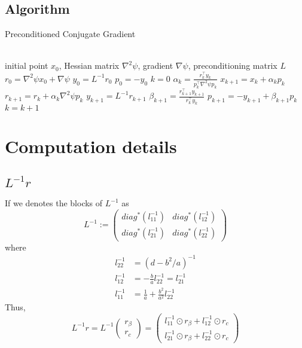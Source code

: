 \documentclass{article}
\begin{document}
\subsection{Algorithm}
\begin{algorithm}[H]
\caption{Preconditioned Conjugate Gradient}
\label{PreconditionedCG}
\begin{algorithmic}
\REQUIRE ~~\\
initial point $x_0$, Hessian matrix $\nabla^2\psi$, gradient $\nabla \psi$, preconditioning matrix $L$
\STATE $r_0 = \nabla^2\psi x_0+\nabla \psi$
\STATE $y_0 = L^{-1}r_0$
\STATE $p_0 = -y_0$
\STATE $k = 0$
\STATE $\alpha_k = \frac{r_k^\top y_k}{p_k^\top \nabla^2\psi p_k}$
\STATE $x_{k+1} = x_k + \alpha_k p_k$
\STATE $r_{k+1} = r_k + \alpha_k \nabla^2\psi p_k$
\STATE $y_{k+1} = L^{-1}r_{k+1}$
\STATE $\beta_{k+1} = \frac{r_{k+1}^\top y_{k+1}}{r_k^\top y_k}$
\STATE $p_{k+1} = -y_{k+1}+\beta_{k+1}p_k$
\STATE $k = k+1$
\ENDWHILE
\end{algorithmic}
\end{algorithm}

\section{Computation details}
\subsection{$L^{-1}r$}
If we denotes the blocks of $L^{-1}$ as
\begin{equation}
    L^{-1} := \begin{pmatrix}
        diag^*(l_{11}^{-1}) & diag^*(l_{12}^{-1})\\
        diag^*(l_{21}^{-1}) & diag^*(l_{22}^{-1})
    \end{pmatrix}
\end{equation}
where
\begin{equation}
    \begin{aligned}
        l_{22}^{-1}&= (d-b^2/a)^{-1}\\
        l_{12}^{-1}&= -\frac{b}{a}l_{22}^{-1} = l_{21}^{-1}\\
        l_{11}^{-1}&= \frac{1}{a} + \frac{b^2}{a^2}l_{22}^{-1}
    \end{aligned}
\end{equation}
Thus,
\begin{equation}
    L^{-1}r = L^{-1}\begin{pmatrix}
        r_{\beta}\\
        r_c
    \end{pmatrix} = \begin{pmatrix}
        l_{11}^{-1}\odot r_{\beta}+l_{12}^{-1}\odot r_{c}\\
        l_{21}^{-1}\odot r_{\beta}+l_{22}^{-1}\odot r_{c}
    \end{pmatrix}
\end{equation}
\end{document}
